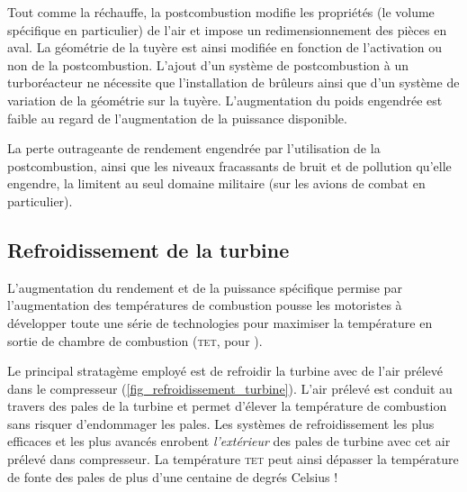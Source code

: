 		Tout comme la réchauffe, la postcombustion modifie les propriétés (le volume spécifique en particulier) de l’air et impose un redimensionnement des pièces en aval. La géométrie de la tuyère est ainsi modifiée en fonction de l’activation ou non de la postcombustion. L’ajout d’un système de postcombustion à un turboréacteur ne nécessite que l'installation de brûleurs ainsi que d’un système de variation de la géométrie sur la tuyère. L’augmentation du poids engendrée est faible au regard de l’augmentation de la puissance disponible.

		La perte outrageante de rendement engendrée par l’utilisation de la postcombustion, ainsi que les niveaux fracassants de bruit et de pollution qu’elle engendre, la limitent au seul domaine militaire (sur les avions de combat en particulier).

		

	\subsection{Refroidissement de la turbine}
	\label{ch_refroidissement_turbine}

		L’augmentation du rendement et de la puissance spécifique permise par l’augmentation des températures de combustion pousse les motoristes à développer toute une série de technologies pour maximiser la température en sortie de chambre de combustion (\textsc{tet}, pour ).

		Le principal stratagème employé est de refroidir la turbine avec de l’air prélevé dans le compresseur (\cref{fig_refroidissement_turbine}). L’air prélevé est conduit au travers des pales de la turbine et permet d’élever la température de combustion sans risquer d’endommager les pales. Les systèmes de refroidissement les plus efficaces et les plus avancés enrobent \emph{l’extérieur} des pales de turbine avec cet air prélevé dans compresseur. La température \textsc{tet} peut ainsi dépasser la température de fonte des pales de plus d’une centaine de degrés Celsius !

